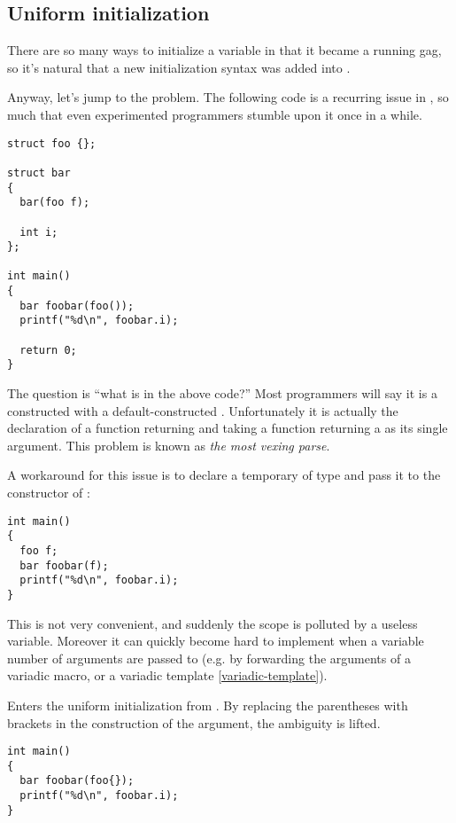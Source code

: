 \subsection{Uniform initialization}
\label{uniform-initialization}

There are so many ways to initialize a variable in \cpp{} that it
became a running gag, so it's natural that a new initialization syntax
was added into .

Anyway, let's jump to the problem. The following code is a recurring
issue in \cpp{}, so much that even experimented programmers stumble
upon it once in a while.

\begin{lstlisting}
struct foo {};

struct bar
{
  bar(foo f);

  int i;
};

int main()
{
  bar foobar(foo());
  printf("%d\n", foobar.i);

  return 0;
}
\end{lstlisting}

The question is ``what is  in the above code?'' Most
\cpp{} programmers will say it is a  constructed with a
default-constructed . Unfortunately it is actually the
declaration of a function returning  and taking a function
returning a  as its single argument. This problem is known
as \emph{the most vexing parse}.

A workaround for this issue is to declare a temporary of type
 and pass it to the constructor of :

\begin{lstlisting}
int main()
{
  foo f;
  bar foobar(f);
  printf("%d\n", foobar.i);
}
\end{lstlisting}

This is not very convenient, and suddenly the scope is polluted by a
useless variable. Moreover it can quickly become hard to implement
when a variable number of arguments are passed to 
(e.g. by forwarding the arguments of a variadic macro, or a variadic
template \ref{variadic-template}).

\bigskip

Enters the uniform initialization from . By replacing the
parentheses with brackets in the construction of the argument, the
ambiguity is lifted.

\begin{lstlisting}
int main()
{
  bar foobar(foo{});
  printf("%d\n", foobar.i);
}
\end{lstlisting}

